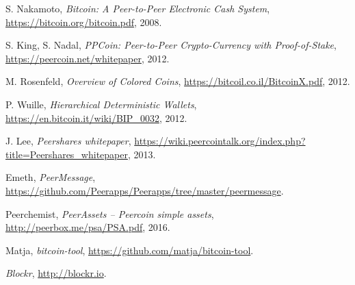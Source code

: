 \documentclass[a4paper,10pt]{article}
\begin{document}
\begin{thebibliography}{9}

  S. Nakamoto,
  \emph{Bitcoin: A Peer-to-Peer Electronic Cash System},
  \url{https://bitcoin.org/bitcoin.pdf},
  2008.

  S. King, S. Nadal,
  \emph{PPCoin: Peer-to-Peer Crypto-Currency with Proof-of-Stake},
  \url{https://peercoin.net/whitepaper},
  2012.

  M. Rosenfeld,
  \emph{Overview of Colored Coins},
  \url{https://bitcoil.co.il/BitcoinX.pdf},
  2012.

  P. Wuille,
  \emph{Hierarchical Deterministic Wallets},
  \url{https://en.bitcoin.it/wiki/BIP_0032},
  2012.

  J. Lee,
  \emph{Peershares whitepaper},
  \url{https://wiki.peercointalk.org/index.php?title=Peershares_whitepaper},
  2013.

  Emeth,
  \emph{PeerMessage},
  \url{https://github.com/Peerapps/Peerapps/tree/master/peermessage}.

  Peerchemist,
  \emph{PeerAssets – Peercoin simple assets},
  \url{http://peerbox.me/psa/PSA.pdf},
  2016.

  Matja,
  \emph{bitcoin-tool},
  \url{https://github.com/matja/bitcoin-tool}.

  \emph{Blockr},
  \url{http://blockr.io}.

\end{thebibliography}
\end{document}
